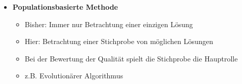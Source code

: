 \begin{itemize}
\begin{itemize}
\begin{itemize}
                        \item \textit{Code}
                            \begin{itemize}
                                \item[]
                                    \begin{verbatim}
                                    TABU-SEARCH
                                    l <- maximale Größe der Tabu List
                                    n <- Anzahl der zu betrachtenden Nachbarschaftslösungen
                                    S <- irgendeine initiale zufällige Lösung
                                    best <- S
                                    L <- { } Tabu List der Länge l
                                    Füge S in L ein
                                    REPEAT
                                        IF Length(L) > l THEN
                                            Entferne ältestes Element aus L
                                        wähle R aus Nachbarschaft von S
                                        FOR n - 1 mal DO
                                            Wähle W aus Nachbarschaft von S
                                            IF W |$\notin$| L und (Quality(W) > Quality(R)) oder R |$\in$| L) THEN
                                                R <- W
                                        IF R |$\notin$| L THEN
                                            S <- R
                                            Füge R in L ein
                                        IF Quality(S) > Quality(best) THEN
                                            best <- S
                                    UNTIL best ist die ideale Lösung oder totale Zeit erreicht
                                    return best
                                    \end{verbatim}
                            \end{itemize}
                    \end{itemize}
            \end{itemize}

\pagebreak

        \item \textbf{Populationsbasierte Methode}
            \begin{itemize}
                \item Bisher: Immer nur Betrachtung einer einzigen Lösung
                \item Hier: Betrachtung einer Stichprobe von möglichen Lösungen
                \item Bei der Bewertung der Qualität spielt die Stichprobe die Hauptrolle
                \item z.B. Evolutionärer Algorithmus
            \end{itemize}
        

\end{itemize}
